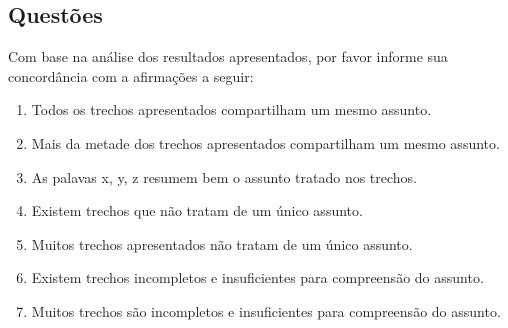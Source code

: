 \newpage

\subsection*{Questões}


Com base na análise dos resultados apresentados, por favor informe sua concordância com a afirmações a seguir:





\begin{enumerate}

\item Todos os trechos apresentados compartilham um mesmo assunto.
\likert

\item Mais da metade dos trechos apresentados compartilham um mesmo assunto.
\likert

\item As palavas x, y, z resumem bem o assunto tratado nos trechos.
\likert

\item Existem trechos que não tratam de um único assunto.
\likert

\item Muitos trechos apresentados não tratam de um único assunto. 
\likert

\item Existem trechos incompletos e insuficientes para compreensão do assunto.
\likert

\item Muitos trechos são incompletos e insuficientes para compreensão do assunto.
\likert



\end{enumerate}







